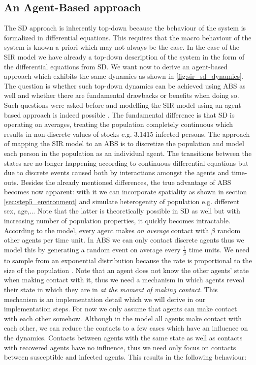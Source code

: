 \subsection*{An Agent-Based approach}
The SD approach is inherently top-down because the behaviour of the system is formalized in differential equations. This requires that the macro behaviour of the system is known a priori which may not always be the case. In the case of the SIR model we have already a top-down description of the system in the form of the differential equations from SD. We want now to derive an agent-based approach which exhibits the same dynamics as shown in \ref{fig:sir_sd_dynamics}. 
The question is whether such top-down dynamics can be achieved using ABS as well and whether there are fundamental drawbacks or benefits when doing so. Such questions were asked before and modelling the SIR model using an agent-based approach is indeed possible \cite{macal_agent-based_2010}. The fundamental difference is that SD is operating on averages, treating the population completely continuous which results in non-discrete values of stocks e.g. 3.1415 infected persons. The approach of mapping the SIR model to an ABS is to discretize the population and model each person in the population as an individual agent. The transitions between the states are no longer happening according to continuous differential equations but due to discrete events caused both by interactions amongst the agents and time-outs. Besides the already mentioned differences, the true advantage of ABS becomes now apparent: with it we can incorporate spatiality as shown in section \ref{sec:step5_environment} and simulate heterogenity of population e.g. different sex, age,... Note that the latter is theoretically possible in SD as well but with increasing number of population properties, it quickly becomes intractable. 
According to the model, every agent makes \textit{on average} contact with $\beta$ random other agents per time unit. In ABS we can only contact discrete agents thus we model this by generating a random event on average every $\frac{1}{\beta}$ time units. We need to sample from an exponential distribution because the rate is proportional to the size of the population \cite{borshchev_system_2004}. Note that an agent does not know the other agents' state when making contact with it, thus we need a mechanism in which agents reveal their state in which they are in \textit{at the moment of making contact}. This mechanism is an implementation detail which we will derive in our implementation steps. For now we only assume that agents can make contact with each other somehow. 
Although in the model all agents make contact with each other, we can reduce the contacts to a few cases which have an influence on the dynamics. Contacts between agents with the same state as well as contacts with recovered agents have no influence, thus we need only focus on contacts between susceptible and infected agents. This results in the following behaviour:

